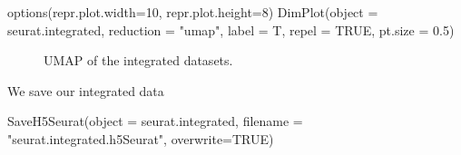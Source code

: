 \documentclass[
  letterpaper,
  DIV=11,
  numbers=noendperiod]{scrartcl}
\newenvironment{Shaded}{}{}
\newcommand{\AttributeTok}[1]{\textcolor[rgb]{0.49,0.56,0.16}{#1}}
\newcommand{\ConstantTok}[1]{\textcolor[rgb]{0.53,0.00,0.00}{#1}}
\newcommand{\DecValTok}[1]{\textcolor[rgb]{0.25,0.63,0.44}{#1}}
\newcommand{\FloatTok}[1]{\textcolor[rgb]{0.25,0.63,0.44}{#1}}
\newcommand{\FunctionTok}[1]{\textcolor[rgb]{0.02,0.16,0.49}{#1}}
\newcommand{\NormalTok}[1]{#1}
\newcommand{\StringTok}[1]{\textcolor[rgb]{0.25,0.44,0.63}{#1}}
\begin{document}
\begin{Shaded}
\begin{Highlighting}[]
\FunctionTok{options}\NormalTok{(}\AttributeTok{repr.plot.width=}\DecValTok{10}\NormalTok{, }\AttributeTok{repr.plot.height=}\DecValTok{8}\NormalTok{)}
\FunctionTok{DimPlot}\NormalTok{(}\AttributeTok{object =}\NormalTok{ seurat.integrated, }\AttributeTok{reduction =} \StringTok{"umap"}\NormalTok{,  }\AttributeTok{label =}\NormalTok{ T, }\AttributeTok{repel =} \ConstantTok{TRUE}\NormalTok{, }\AttributeTok{pt.size =} \FloatTok{0.5}\NormalTok{)}
\end{Highlighting}
\end{Shaded}

\begin{figure}[H]


\caption{\label{fig-umapint}UMAP of the integrated datasets.}

\end{figure}%

We save our integrated data

\begin{Shaded}
\begin{Highlighting}[]
\FunctionTok{SaveH5Seurat}\NormalTok{(}\AttributeTok{object =}\NormalTok{ seurat.integrated, }\AttributeTok{filename =} \StringTok{"seurat.integrated.h5Seurat"}\NormalTok{, }\AttributeTok{overwrite=}\ConstantTok{TRUE}\NormalTok{)}
\end{Highlighting}
\end{Shaded}
\end{document}
